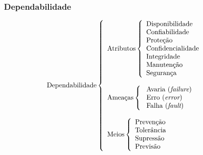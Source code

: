 \documentclass{beamer}
\begin{document}
\begin{frame}
    \frametitle{Dependabilidade}

\begin{figure}[htb]
\centering
\footnotesize
\[
\text{Dependabilidade}
\left\{
\begin{array}{l}
\text{Atributos}
    \left\{
    \begin{array}{l}
        \text{Disponibilidade}\\
        \text{Confiabilidade}\\
        \text{Proteção}\\
        \text{Confidencialidade}\\
        \text{Integridade}\\
        \text{Manutenção}\\
        \text{Segurança}
    \end{array}
    \right.
\\
\\
\text{Ameaças}
    \left\{
    \begin{array}{l}
        \text{\color{red} Avaria ({\it failure})}\\
        \text{\color{red} Erro ({\it error})}\\
        \text{\color{red} Falha ({\it fault})}
    \end{array}
    \right.
\\
\\
\text{Meios}
    \left\{
    \begin{array}{l}
        \text{Prevenção}\\
        \text{Tolerância}\\
        \text{Supressão}\\
        \text{Previsão}
    \end{array}
    \right.
\end{array}
\right.
\]
\end{figure}

\end{frame}

\end{document}
